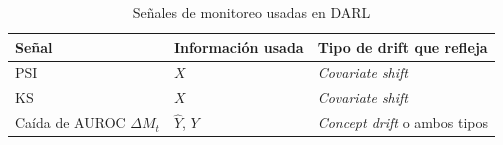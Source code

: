 \begin{table}[H]
    \centering
    \caption{Señales de monitoreo usadas en DARL}
    \label{tab:metricas_drift_darl}
    \begin{tabular}{lll}
        \toprule
        \textbf{Señal}               & \textbf{Información usada} & \textbf{Tipo de drift que refleja}        \\
        \midrule
        PSI                          & $X$                        & \textit{Covariate shift}                  \\
        KS                           & $X$                        & \textit{Covariate shift}                  \\
        Caída de AUROC $\Delta M_t$  & $\hat{Y}$, $Y$             & \textit{Concept drift} o ambos tipos      \\
        \bottomrule
    \end{tabular}
\end{table}
